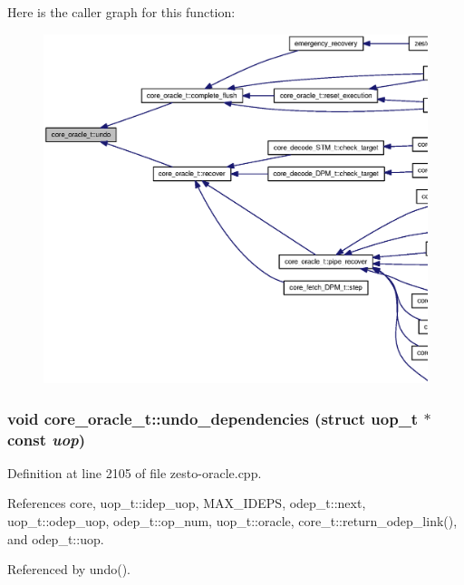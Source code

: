 Here is the caller graph for this function:\nopagebreak
\begin{figure}[H]
\begin{center}
\leavevmode
\includegraphics[width=420pt]{classcore__oracle__t_0d7765bb5655c1dd28f758143caaa8ce_icgraph}
\end{center}
\end{figure}
\subsubsection[{undo\_\-dependencies}]{\setlength{\rightskip}{0pt plus 5cm}void core\_\-oracle\_\-t::undo\_\-dependencies (struct {\bf uop\_\-t} $\ast$const  {\em uop})\hspace{0.3cm}{\tt  [protected]}}\label{classcore__oracle__t_56379122fc2f63fc767cdf82e346b98b}




Definition at line 2105 of file zesto-oracle.cpp.

References core, uop\_\-t::idep\_\-uop, MAX\_\-IDEPS, odep\_\-t::next, uop\_\-t::odep\_\-uop, odep\_\-t::op\_\-num, uop\_\-t::oracle, core\_\-t::return\_\-odep\_\-link(), and odep\_\-t::uop.

Referenced by undo().


